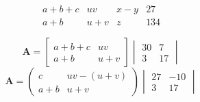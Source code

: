 \documentclass{sample}
\begin{document}
\[
    \begin{matrix}
        a + b + c & uv & x - y & 27\\
        a + b & u + v & z & 134
    \end{matrix}
\]

\[
    \mathbf{A} =
    \begin{bmatrix}
        a+b+c & uv\\
        a+b & u+v
    \end{bmatrix}
    \begin{vmatrix}
        30 & 7\\
        3 & 17
    \end{vmatrix}
\]
\[
    \mathbf{A} =
    \begin{pmatrix}
        c & uv -(u+v)\\
        a+b & u+v
    \end{pmatrix}
    \begin{vmatrix}
        27 & -10\\
        3 & 17
    \end{vmatrix}
\]
\end{document}
